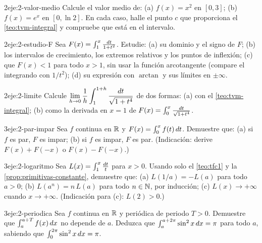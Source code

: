 \begin{ejercicio}{2}{eje:2-valor-medio}
Calcule el valor medio de: (a) $f(x)=x^{2}$ en $[0,3]$; (b) $f(x)=e^{x}$ en $[0,\ln2]$. En cada caso, halle el punto $c$ que proporciona el \cref{teo:tvm-integral} y compruebe que está en el intervalo.
\end{ejercicio}

\begin{ejercicio}{2}{eje:2-estudio-F}
Sea $F(x)=\int_1^{x}\frac{\mathop{}\!d t}{1+t^{2}}$. Estudie: (a) su dominio y el signo de $F$; (b) los intervalos de crecimiento, los extremos relativos y los puntos de inflexión; (c) que $F(x)<1$ para todo $x>1$, sin usar la función arcotangente (compare el integrando con $1/t^{2}$); (d) su expresión con $\arctan$ y sus límites en $\pm\infty$.
\end{ejercicio}

\begin{ejercicio}{2}{eje:2-limite}
Calcule $\displaystyle\lim_{h\to0}\frac1h\int_1^{1+h}\frac{\mathop{}\!d t}{\sqrt{1+t^{4}}}$ de dos formas: (a) con el \cref{teo:tvm-integral}; (b) como la derivada en $x=1$ de $F(x)=\int_0^{x}\frac{\mathop{}\!d t}{\sqrt{1+t^{4}}}$.
\end{ejercicio}

\begin{ejercicio}{3}{eje:2-par-impar}
Sea $f$ continua en $\mathbb{R}$ y $F(x)=\int_0^{x}f(t)\mathop{}\!d t$. Demuestre que: (a) si $f$ es par, $F$ es impar; (b) si $f$ es impar, $F$ es par. (Indicación: derive $F(x)+F(-x)$ o $F(x)-F(-x)$.)
\end{ejercicio}

\begin{ejercicio}{3}{eje:2-logaritmo}
Sea $L(x)=\int_1^{x}\frac{\mathop{}\!d t}{t}$ para $x>0$. Usando solo el \cref{teo:tfc1} y la \cref{prop:primitivas-constante}, demuestre que: (a) $L(1/a)=-L(a)$ para todo $a>0$; (b) $L(a^{n})=n\,L(a)$ para todo $n\in\mathbb{N}$, por inducción; (c) $L(x)\to+\infty$ cuando $x\to+\infty$. (Indicación para (c): $L(2)>0$.)
\end{ejercicio}

\begin{ejercicio}{3}{eje:2-periodica}
Sea $f$ continua en $\mathbb{R}$ y periódica de periodo $T>0$. Demuestre que $\int_a^{a+T}f(x)\mathop{}\!d x$ no depende de $a$. Deduzca que $\int_a^{a+2\pi}\sin^{2}x\mathop{}\!d x=\pi$ para todo $a$, sabiendo que $\int_0^{2\pi}\sin^{2}x\mathop{}\!d x=\pi$.
\end{ejercicio}

